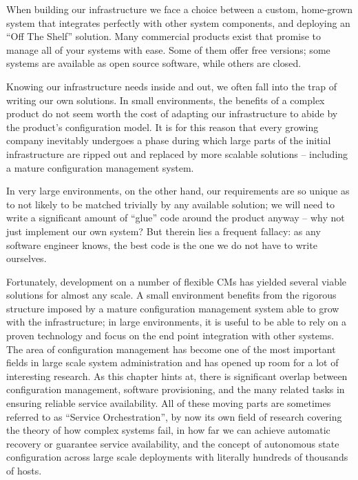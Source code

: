 When building our infrastructure we face a choice
between a custom, home-grown system that integrates
perfectly with other system components, and deploying
an ``Off The Shelf'' solution.  Many commercial
products exist that promise to manage all of your
systems with ease.  Some of them offer free versions;
some systems are available as open source software,
while others are closed.

Knowing our infrastructure needs inside and out, we
often fall into the trap of writing our own solutions.
In small environments, the benefits of a complex
product do not seem worth the cost of adapting our
infrastructure to abide by the product's configuration
model.  It is for this reason that every growing
company inevitably undergoes a phase during which
large parts of the initial infrastructure are ripped
out and replaced by more scalable solutions --
including a mature configuration management system.

In very large environments, on the other hand, our
requirements are so unique as to not likely to be
matched trivially by any available solution; we will
need to write a significant amount of ``glue'' code
around the product anyway -- why not just implement
our own system?  But therein lies a frequent fallacy:
as any software engineer knows, the best code is the
one we do not have to write ourselves.

Fortunately, development on a number of flexible CMs
has yielded several viable solutions for almost any
scale.  A small environment benefits from the rigorous
structure imposed by a mature configuration management
system able to grow with the infrastructure; in large
environments, it is useful to be able to rely on a
proven technology and focus on the end point
integration with other systems.  \\

The area of configuration management has become one of
the most important fields in large scale system
administration and has opened up room for a lot of
interesting research.  As this chapter hints at, there is
significant overlap between configuration management,
software provisioning, and the
many related tasks in ensuring reliable service
availability.  All of these moving parts are sometimes
referred to as ``Service Orchestration'', by now its own field of research
covering the theory of how complex systems fail, in
how far we can achieve automatic recovery or guarantee
service availability, and the concept of autonomous
state configuration across large scale deployments
with literally hundreds of thousands of hosts.


